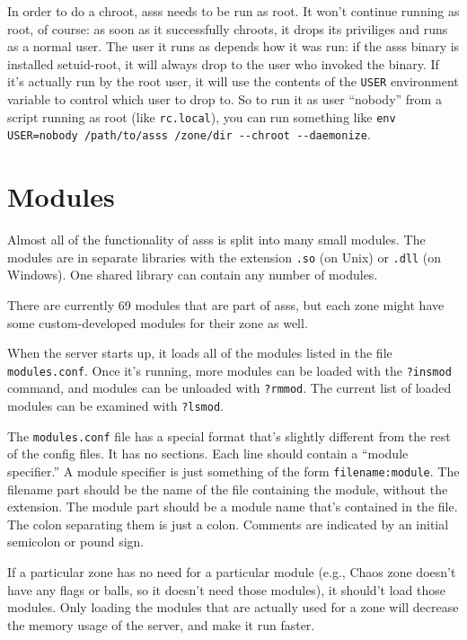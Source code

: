 \documentclass{article}
\newcommand{\asss}{asss}
\begin{document}
In order to do a chroot, \asss{} needs to be run as root. It won't
continue running as root, of course: as soon as it successfully chroots,
it drops its priviliges and runs as a normal user. The user it runs as
depends how it was run: if the \asss{} binary is installed setuid-root,
it will always drop to the user who invoked the binary. If it's actually
run by the root user, it will use the contents of the \verb/USER/
environment variable to control which user to drop to. So to run it as
user ``nobody'' from a script running as root (like \verb/rc.local/),
you can run something like
\verb|env USER=nobody /path/to/asss /zone/dir --chroot --daemonize|.


\section{Modules}

Almost all of the functionality of \asss{} is split into many small
modules. The modules are in separate libraries with the extension
\verb/.so/ (on Unix) or \verb/.dll/ (on Windows). One shared library can
contain any number of modules.

There are currently
69
modules that are part of \asss{}, but each zone might have some
custom-developed modules for their zone as well.

When the server starts up, it loads all of the modules listed in the
file \verb/modules.conf/. Once it's running, more modules can be loaded
with the \verb/?insmod/ command, and modules can be unloaded with
\verb/?rmmod/. The current list of loaded modules can be examined with
\verb/?lsmod/.

The \verb/modules.conf/ file has a special format that's slightly
different from the rest of the config files. It has no sections. Each
line should contain a ``module specifier.'' A module specifier is just
something of the form \verb/filename:module/. The filename part should
be the name of the file containing the module, without the extension.
The module part should be a module name that's contained in the file.
The colon separating them is just a colon. Comments are indicated by an
initial semicolon or pound sign.

If a particular zone has no need for a particular module (e.g., Chaos
zone doesn't have any flags or balls, so it doesn't need those modules),
it should't load those modules. Only loading the modules that are
actually used for a zone will decrease the memory usage of the server,
and make it run faster.
\end{document}
